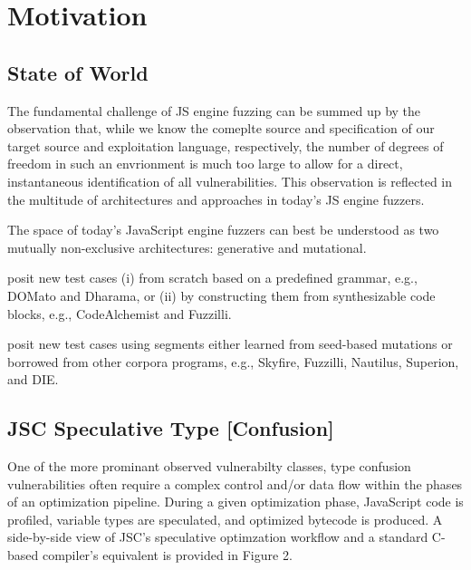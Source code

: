 \section{Motivation}

\subsection{State of World}

The fundamental challenge of JS engine fuzzing can be summed up by the observation that,
while we know the comeplte source and specification of our target source and exploitation language, respectively,
the number of degrees of freedom in such an envrionment is much too large to allow for a direct, instantaneous
identification of all vulnerabilities. This observation is reflected in the multitude of architectures and
approaches in today's JS engine fuzzers.

The space of today's JavaScript engine fuzzers can best be understood
as two mutually non-exclusive architectures: generative and mutational.
\vspace{-1em}%

 posit new test cases 
(i) from scratch based on a predefined grammar, e.g., DOMato\cite{domato} and Dharama\cite{dharma}, or
(ii) by constructing them from synthesizable code blocks, e.g., CodeAlchemist\cite{codealchemist_2019} and Fuzzilli\cite{saelo_thesis}.

 posit new test cases using segments either learned from seed-based mutations
or borrowed from other corpora programs, e.g., Skyfire\cite{skyfire_2017}, Fuzzilli\cite{saelo_thesis},
Nautilus\cite{nautilus_2019}, Superion\cite{superion_2019}, and DIE\cite{die_2020}.

\subsection{JSC Speculative Type [Confusion]}

One of the more prominant observed vulnerabilty classes, type confusion vulnerabilities often require a complex 
control and/or data flow within the phases of an optimization pipeline. During a given optimization phase,
JavaScript code is profiled, variable types are speculated, and optimized bytecode is produced\footnotemark.
A side-by-side view of JSC's speculative optimzation workflow and a standard C-based compiler's equivalent is
provided in Figure 2.

